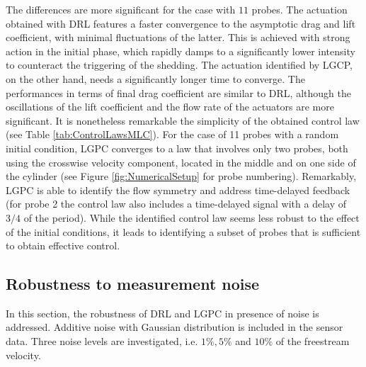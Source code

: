 The differences are more significant for the case with $11$ probes. The actuation obtained with DRL features a faster convergence to the asymptotic drag and lift coefficient, with minimal fluctuations of the latter. This is achieved with strong action in the initial phase, which rapidly damps to a significantly lower intensity to counteract the triggering of the shedding. The actuation identified by LGCP, on the other hand, needs a significantly longer time to converge. The performances in terms of final drag coefficient are similar to DRL, although the oscillations of the lift coefficient and the flow rate of the actuators are more significant. It is nonetheless remarkable the simplicity of the obtained control law (see Table \ref{tab:ControlLawsMLC}). For the case of 11 probes with a random initial condition, LGPC converges to a law that involves only two probes, both using the crosswise velocity component, located in the middle and on one side of the cylinder (see Figure \ref{fig:NumericalSetup} for probe numbering). Remarkably, LGPC is able to identify the flow symmetry and address time-delayed feedback (for probe 2 the control law also includes a time-delayed signal with a delay of $3/4$ of the period). While the identified control law seems less robust to the effect of the initial conditions, it leads to identifying a subset of probes that is sufficient to obtain effective control.

\subsection{Robustness to measurement noise}
\label{ss:noise}

In this section, the robustness of DRL and LGPC in presence of noise is addressed. Additive noise with Gaussian distribution is included in the sensor data. Three noise levels are investigated, i.e. $1\%,5\%$ and $10\%$ of the freestream velocity.

